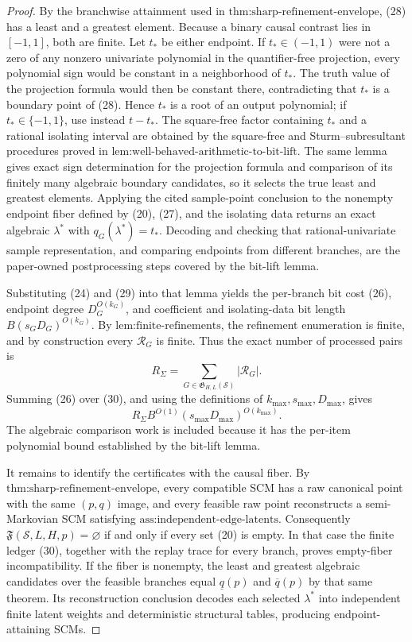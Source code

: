 \documentclass{article}
\begin{document}
\begin{proof}
By the branchwise attainment used in \(\text{thm:sharp-refinement-envelope}\), (28) has a least and a greatest element.  Because a binary causal contrast lies in \([-1,1]\), both are finite.  Let \(t_*\) be either endpoint.  If \(t_*\in(-1,1)\) were not a zero of any nonzero univariate polynomial in the quantifier-free projection, every polynomial sign would be constant in a neighborhood of \(t_*\).  The truth value of the projection formula would then be constant there, contradicting that \(t_*\) is a boundary point of (28).  Hence \(t_*\) is a root of an output polynomial; if \(t_*\in\{-1,1\}\), use instead \(t-t_*\).  The square-free factor containing \(t_*\) and a rational isolating interval are obtained by the square-free and Sturm--subresultant procedures proved in \(\text{lem:well-behaved-arithmetic-to-bit-lift}\).  The same lemma gives exact sign determination for the projection formula and comparison of its finitely many algebraic boundary candidates, so it selects the true least and greatest elements.  Applying the cited sample-point conclusion to the nonempty endpoint fiber defined by (20), (27), and the isolating data returns an exact algebraic \(\lambda^*\) with \(q_G(\lambda^*)=t_*\).  Decoding and checking that rational-univariate sample representation, and comparing endpoints from different branches, are the paper-owned postprocessing steps covered by the bit-lift lemma.

Substituting (24) and (29) into that lemma yields the per-branch bit cost (26), endpoint degree \(D_G^{O(k_G)}\), and coefficient and isolating-data bit length \(B(s_GD_G)^{O(k_G)}\).  By \(\text{lem:finite-refinements}\), the refinement enumeration is finite, and by construction every \(\mathcal R_G\) is finite.  Thus the exact number of processed pairs is
\[
R_{\Sigma}=\sum_{G\in\mathfrak G_{H,L}(\mathcal S)}|\mathcal R_G|.
\tag{30}
\]
Summing (26) over (30), and using the definitions of \(k_{\max},s_{\max},D_{\max}\), gives
\[
R_{\Sigma}B^{O(1)}(s_{\max}D_{\max})^{O(k_{\max})}.
\tag{31}
\]
The algebraic comparison work is included because it has the per-item polynomial bound established by the bit-lift lemma.

It remains to identify the certificates with the causal fiber.  By \(\text{thm:sharp-refinement-envelope}\), every compatible SCM has a raw canonical point with the same \((p,q)\) image, and every feasible raw point reconstructs a semi-Markovian SCM satisfying \(\text{ass:independent-edge-latents}\).  Consequently \(\mathfrak F(\mathcal S,L,H,p)=\varnothing\) if and only if every set (20) is empty.  In that case the finite ledger (30), together with the replay trace for every branch, proves empty-fiber incompatibility.  If the fiber is nonempty, the least and greatest algebraic candidates over the feasible branches equal \(\underline q(p)\) and \(\overline q(p)\) by that same theorem.  Its reconstruction conclusion decodes each selected \(\lambda^*\) into independent finite latent weights and deterministic structural tables, producing endpoint-attaining SCMs.


\end{proof}
\end{document}
